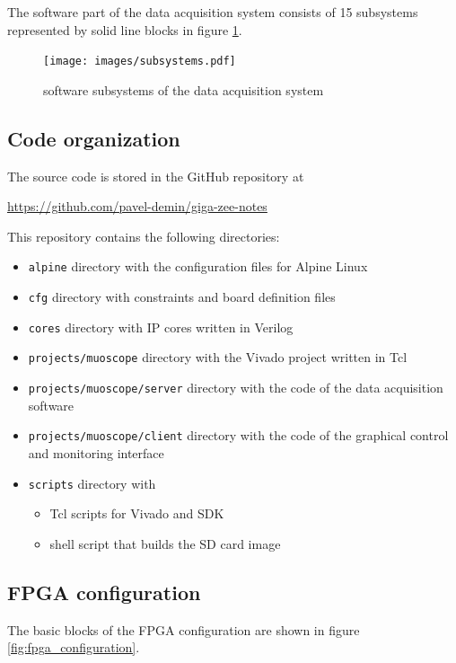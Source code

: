 \documentclass[12pt, a4paper]{article}
\begin{document}
The software part of the data acquisition system consists of 15 subsystems represented by solid line blocks in figure \ref{fig:subsystems}.

\begin{figure}[h!]
  \centering
  \texttt{[image: images/subsystems.pdf]}
  \caption{software subsystems of the data acquisition system}
  \label{fig:subsystems}
\end{figure}

\subsection{Code organization}

The source code is stored in the GitHub repository at

\url{https://github.com/pavel-demin/giga-zee-notes}

This repository contains the following directories:
\begin{itemize}[nosep]
  \item \texttt{alpine} directory with the configuration files for Alpine Linux
  \item \texttt{cfg} directory with constraints and board definition files
  \item \texttt{cores} directory with IP cores written in Verilog
  \item \texttt{projects/muoscope} directory with the Vivado project written in Tcl
  \item \texttt{projects/muoscope/server} directory with the code of the data acquisition software
  \item \texttt{projects/muoscope/client} directory with the code of the graphical control and monitoring interface
  \item \texttt{scripts} directory with
  \begin{itemize}[nosep]
    \item Tcl scripts for Vivado and SDK
    \item shell script that builds the SD card image
  \end{itemize}
\end{itemize}

\subsection{FPGA configuration}

The basic blocks of the FPGA configuration are shown in figure \ref{fig:fpga_configuration}.
\end{document}
